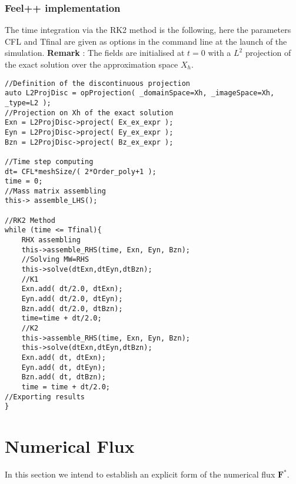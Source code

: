 \documentclass[a4paper,oneside,10pt]{report}
\begin{document}
\subsubsection{\textbf{Feel++} implementation}
The time integration via the RK2 method is the following, here the parameters CFL and Tfinal are given as options in the command line at the launch of the simulation.
\textbf{Remark} : The fields are initialised at $t=0$ with a $L^2$ projection of the exact solution over the approximation space $X_h$.
\begin{center}
\begin{minipage}{\textwidth}
\begin{lstlisting}[label=code2,caption=Integration en temps : run()]
//Definition of the discontinuous projection
auto L2ProjDisc = opProjection( _domainSpace=Xh, _imageSpace=Xh, _type=L2 );
//Projection on Xh of the exact solution 
Exn = L2ProjDisc->project( Ex_ex_expr );
Eyn = L2ProjDisc->project( Ey_ex_expr );
Bzn = L2ProjDisc->project( Bz_ex_expr );

//Time step computing
dt= CFL*meshSize/( 2*Order_poly+1 );
time = 0;
//Mass matrix assembling
this-> assemble_LHS();

//RK2 Method
while (time <= Tfinal){
	RHX assembling
	this->assemble_RHS(time, Exn, Eyn, Bzn);
	//Solving MW=RHS
	this->solve(dtExn,dtEyn,dtBzn);
	//K1
	Exn.add( dt/2.0, dtExn);
	Eyn.add( dt/2.0, dtEyn);
	Bzn.add( dt/2.0, dtBzn);
	time=time + dt/2.0;
	//K2
	this->assemble_RHS(time, Exn, Eyn, Bzn);
	this->solve(dtExn,dtEyn,dtBzn);
	Exn.add( dt, dtExn);
	Eyn.add( dt, dtEyn);
	Bzn.add( dt, dtBzn);
	time = time + dt/2.0;
//Exporting results
}
\end{lstlisting}
\end{minipage}
\end{center}

\section{Numerical Flux}
In this section we intend to establish an explicit form of the numerical flux $\mathbf{F}^*$.
\end{document}
